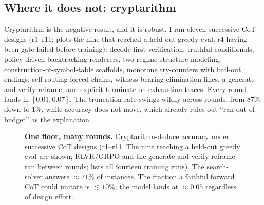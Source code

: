 \documentclass[11pt]{article}
\begin{document}
\subsection{Where it does not: cryptarithm}
\label{sec:res-crypt}

Cryptarithm is the negative result, and it is robust. I ran eleven successive CoT designs
(r1--r11;  plots the nine that reached a held-out greedy eval, r4 having been
gate-failed before training): decode-first verification, truthful
conditionals, policy-driven backtracking renderers, two-regime structure modeling,
construction-of-symbol-table scaffolds, monotone try-counters with bail-out endings,
self-routing forced chains, witness-bearing elimination lines, a generate-and-verify
reframe, and explicit terminate-on-exhaustion traces. Every round lands in $[0.01,0.07]$.
The truncation rate swings wildly across rounds, from $87\%$ down to $1\%$, while accuracy
does not move, which already rules out ``ran out of budget'' as the explanation.

\begin{figure}[tbp]
\centering
{}
\caption{\textbf{One floor, many rounds.} Cryptarithm-deduce accuracy under successive CoT
designs (r1--r11. The nine reaching a held-out greedy eval are shown; RLVR/GRPO and the
generate-and-verify reframe ran between rounds;  lists all fourteen training
runs). The
search-solver answers $\approx\!71\%$ of instances. The fraction a faithful forward CoT
could imitate is $\lesssim\!10\%$; the model lands at $\approx\!0.05$ regardless of design
effort.}
\label{fig:crypt}
\end{figure}
\end{document}
